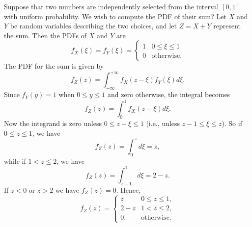 \begin{example}
Suppose that two numbers are independently selected from the interval $[0,1]$ with uniform probability.
We wish to compute the PDF of their sum?
Let $X$ and $Y$ be random variables describing the two choices, and let $Z = X + Y$ represent the sum.
Then the PDFs of $X$ and $Y$ are
\begin{equation*}
f_X(\xi) = f_Y(\xi)
= \begin{cases} 1 & 0 \leq \xi \leq 1 \\
0 & \text{otherwise} . \end{cases}
\end{equation*}
The PDF for the sum is given by
\begin{equation*}
f_Z(z) = \int_{-\infty}^{+\infty} f_X(z - \xi) f_Y(\xi) d\xi .
\end{equation*}
Since $f_Y(y) = 1$ when $0 \leq y \leq 1$ and zero otherwise, the integral becomes
\begin{equation*}
f_Z(z) = \int_0^1 f_X(z - \xi) d\xi .
\end{equation*}
Now the integrand is zero unless $0 \leq z - \xi \leq 1$ (i.e., unless $z - 1 \leq \xi \leq z$).
So if $0 \leq z \leq 1$, we have
\begin{equation*}
f_Z(z) = \int_0^z d\xi = z,
\end{equation*}
while if $1 < z \leq 2$, we have
\begin{equation*}
f_Z(z) = \int_{z - 1}^1 d\xi = 2 - z .
\end{equation*}
If $z < 0$ or $z > 2$ we have $f_Z(z) = 0$.
Hence,
\begin{equation*}
f_Z(z) = \begin{cases} z & 0 \leq z \leq 1, \\
2-z & 1 < z \leq 2, \\
0, & \text{otherwise} . \end{cases}
\end{equation*}
\end{example}

